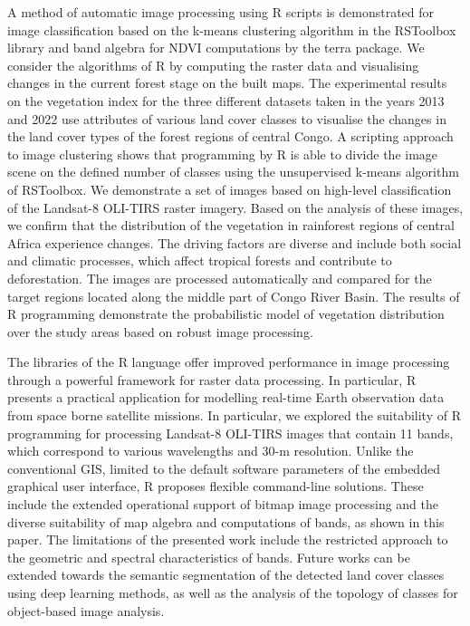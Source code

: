 \documentclass[applsci,article,accept,pdftex,moreauthors]{Definitions/mdpi}
\begin{document}
{A method of }automatic image processing using R scripts {is demonstrated }for image classification based on the k-means clustering algorithm in the RSToolbox library and band algebra for NDVI computations by the terra package. We consider the algorithms of R by computing the raster data and visualising changes in the current forest stage on the built maps. The experimental results on the vegetation index for the three different datasets taken in the years 2013 and 2022 use attributes of various land cover classes to visualise the changes in the land cover types of the forest regions of central Congo. A scripting approach to image clustering shows that {programming by} R is able to divide the image scene on the defined number of classes using the unsupervised k-means algorithm of RSToolbox. We demonstrate a set of images based on high-level classification of the Landsat-8 OLI-TIRS raster imagery. Based on the analysis of these images, we confirm that the distribution of the vegetation in rainforest regions of central Africa experience changes. The driving factors are diverse and include both social and climatic processes, which affect tropical forests and contribute to deforestation. The images are processed automatically and compared for the target regions {located} along the middle part of Congo River Basin. The results of R {programming} demonstrate the probabilistic model of vegetation distribution over the study areas based on robust image {processing}. 

The libraries of the R language offer improved performance in image processing through a powerful framework for raster data processing. In particular, R presents {a }practical application for modelling real-time Earth observation data from space borne satellite missions. In particular, we { }explored the suitability of R programming for processing Landsat-8 OLI-TIRS images that contain 11 bands, which correspond to various wavelengths and 30-m resolution. Unlike the conventional GIS, limited to the default software parameters of the embedded graphical user interface, R proposes flexible command-line solutions. These include {the }extended operational support of bitmap image processing and the diverse suitability of map algebra and computations of bands, as shown in this paper. The limitations of the presented work include the restricted approach to the geometric and spectral characteristics of bands. Future works can be extended towards the semantic segmentation of the detected land cover classes using deep learning methods, as well as the analysis of the topology of classes for object-based image analysis.
\end{document}
